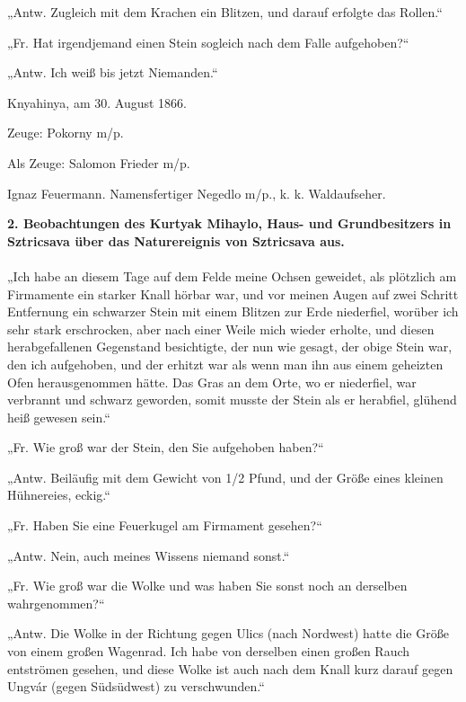 \documentclass[a4paper, 11pt, oneside, german]{article}
\begin{document}
„Antw. Zugleich mit dem Krachen ein Blitzen, und darauf erfolgte das Rollen.“

„Fr. Hat irgendjemand einen Stein sogleich nach dem Falle aufgehoben?“

„Antw. Ich weiß bis jetzt Niemanden.“

\hspace*{10mm}Knyahinya, am 30. August 1866.

\hspace*{15mm}Zeuge: Pokorny m/p.

\hspace*{15mm}Als Zeuge: Salomon Frieder m/p.

\hspace*{15mm}Ignaz Feuermann. Namensfertiger Negedlo m/p., k. k. Waldaufseher.
\begin{center}
\textbf{2. Beobachtungen des Kurtyak Mihaylo, Haus- und Grundbesitzers in Sztricsava über das Naturereignis von Sztricsava aus.}
\end{center}
\paragraph{}
„Ich habe an diesem Tage auf dem Felde meine Ochsen geweidet, als plötzlich am Firmamente ein starker Knall hörbar war, und vor meinen Augen auf zwei Schritt Entfernung ein schwarzer Stein mit einem Blitzen zur Erde niederfiel, worüber ich sehr stark erschrocken, aber nach einer Weile mich wieder erholte, und diesen herabgefallenen Gegenstand besichtigte, der nun wie gesagt, der obige Stein war, den ich aufgehoben, und der erhitzt war als wenn man ihn aus einem geheizten Ofen herausgenommen hätte. Das Gras an dem Orte, wo er niederfiel, war verbrannt und schwarz geworden, somit musste der Stein als er herabfiel, glühend heiß gewesen sein.“

„Fr. Wie groß war der Stein, den Sie aufgehoben haben?“

„Antw. Beiläufig mit dem Gewicht von 1/2 Pfund, und der Größe eines kleinen Hühnereies, eckig.“

„Fr. Haben Sie eine Feuerkugel am Firmament gesehen?“

„Antw. Nein, auch meines Wissens niemand sonst.“

„Fr. Wie groß war die Wolke und was haben Sie sonst noch an derselben wahrgenommen?“

„Antw. Die Wolke in der Richtung gegen Ulics (nach Nordwest) hatte die Größe von einem großen Wagenrad. Ich habe von derselben einen großen Rauch entströmen gesehen, und diese Wolke ist auch nach dem Knall kurz darauf gegen Ungvár (gegen Südsüdwest) zu verschwunden.“
\end{document}
